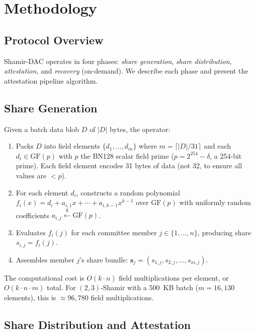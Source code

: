 
\section{Methodology}

\subsection{Protocol Overview}

Shamir-DAC operates in four phases: \emph{share generation}, \emph{share
distribution}, \emph{attestation}, and \emph{recovery} (on-demand). We
describe each phase and present the attestation pipeline algorithm.

\subsection{Share Generation}

Given a batch data blob $D$ of $|D|$ bytes, the operator:

\begin{enumerate}
\item Packs $D$ into field elements $\{d_1, \ldots, d_m\}$ where
  $m = \lceil |D| / 31 \rceil$ and each $d_i \in \mathrm{GF}(p)$ with
  $p$ the BN128 scalar field prime ($p = 2^{254} - \delta$, a 254-bit
  prime). Each field element encodes 31 bytes of data (not 32, to ensure
  all values are $< p$).
\item For each element $d_i$, constructs a random polynomial
  $f_i(x) = d_i + a_{i,1} x + \cdots + a_{i,k-1} x^{k-1}$ over
  $\mathrm{GF}(p)$ with uniformly random coefficients
  $a_{i,j} \stackrel{\$}{\leftarrow} \mathrm{GF}(p)$.
\item Evaluates $f_i(j)$ for each committee member $j \in \{1, \ldots, n\}$,
  producing share $s_{i,j} = f_i(j)$.
\item Assembles member $j$'s share bundle:
  $\mathbf{s}_j = (s_{1,j}, s_{2,j}, \ldots, s_{m,j})$.
\end{enumerate}

The computational cost is $O(k \cdot n)$ field multiplications per element,
or $O(k \cdot n \cdot m)$ total. For $(2,3)$-Shamir with a 500~KB batch
($m = 16{,}130$ elements), this is $\approx 96{,}780$ field multiplications.

\subsection{Share Distribution and Attestation}

